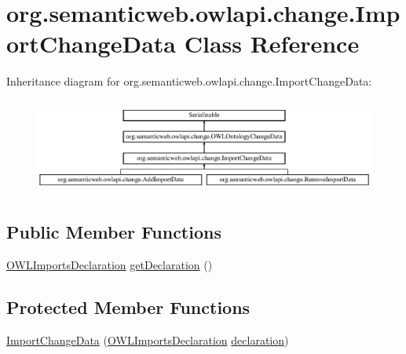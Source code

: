 \hypertarget{classorg_1_1semanticweb_1_1owlapi_1_1change_1_1_import_change_data}{\section{org.\-semanticweb.\-owlapi.\-change.\-Import\-Change\-Data Class Reference}
\label{classorg_1_1semanticweb_1_1owlapi_1_1change_1_1_import_change_data}
}
Inheritance diagram for org.\-semanticweb.\-owlapi.\-change.\-Import\-Change\-Data\-:\begin{figure}[H]
\begin{center}
\leavevmode
\includegraphics[height=3.163842cm]{classorg_1_1semanticweb_1_1owlapi_1_1change_1_1_import_change_data}
\end{center}
\end{figure}
\subsection*{Public Member Functions}
\begin{DoxyCompactItemize}
\item 
\hyperlink{interfaceorg_1_1semanticweb_1_1owlapi_1_1model_1_1_o_w_l_imports_declaration}{O\-W\-L\-Imports\-Declaration} \hyperlink{classorg_1_1semanticweb_1_1owlapi_1_1change_1_1_import_change_data_a3ba40ffa47ae50d6045d6c409d722fdc}{get\-Declaration} ()
\end{DoxyCompactItemize}
\subsection*{Protected Member Functions}
\begin{DoxyCompactItemize}
\item 
\hyperlink{classorg_1_1semanticweb_1_1owlapi_1_1change_1_1_import_change_data_ae07d0a920e2aee41a38c085f661c1c1a}{Import\-Change\-Data} (\hyperlink{interfaceorg_1_1semanticweb_1_1owlapi_1_1model_1_1_o_w_l_imports_declaration}{O\-W\-L\-Imports\-Declaration} \hyperlink{classorg_1_1semanticweb_1_1owlapi_1_1change_1_1_import_change_data_a23afda3aff2c6ee273efff9db5bb5315}{declaration})
\end{DoxyCompactItemize}

